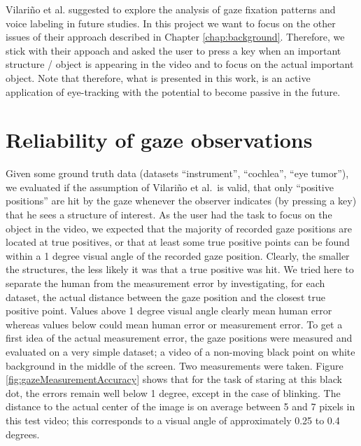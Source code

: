 Vilari\~no et al. suggested to explore the analysis of gaze fixation patterns and voice labeling in future studies. 
In this project we want to focus on the other issues of their approach described in Chapter \ref{chap:background}. 
Therefore, we stick with their appoach and asked the user to press a key when an important structure / object is appearing in the video and to focus on the actual important object. 
Note that therefore, what is presented in this work, is an active application of eye-tracking with the potential to become passive in the future.

\section{Reliability of gaze observations}
Given some ground truth data (datasets ``instrument'', ``cochlea'', ``eye tumor''), we evaluated if the assumption of Vilari\~no et al.\ is valid, that only ``positive positions'' are hit by the gaze whenever the observer indicates (by pressing a key) that he sees a structure of interest. 
As the user had the task to focus on the object in the video, we expected that the majority of recorded gaze positions are located at true positives, or that at least some true positive points can be found within a 1 degree visual angle of the recorded gaze position. 
Clearly, the smaller the structures, the less likely it was that a true positive was hit. 
We tried here to separate the human from the measurement error by investigating, for each dataset, the actual distance between the gaze position and the closest true positive point. 
Values above 1 degree visual angle clearly mean human error whereas values below could mean human error or measurement error. 
To get a first idea of the actual measurement error, the gaze positions were measured and evaluated on a very simple dataset; a video of a non-moving black point on white background in the middle of the screen. 
Two measurements were taken. Figure \ref{fig:gazeMeasurementAccuracy} shows that for the task of staring at this black dot, the errors remain well below 1 degree, except in the case of blinking. 
The distance to the actual center of the image is on average between 5 and 7 pixels in this test video; this corresponds to a visual angle of approximately 0.25 to 0.4 degrees.

